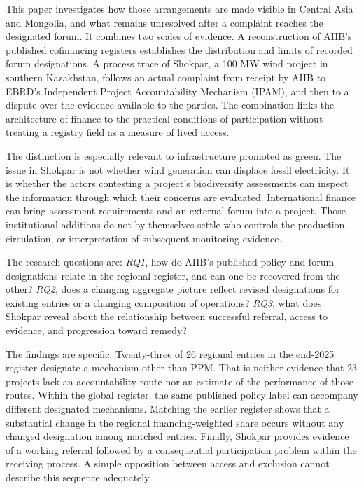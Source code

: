 \documentclass[11pt,a4paper]{article}
\begin{document}
This paper investigates how those arrangements are made visible in Central Asia and Mongolia, and what remains unresolved after a complaint reaches the designated forum. It combines two scales of evidence. A reconstruction of AIIB's published cofinancing registers establishes the distribution and limits of recorded forum designations. A process trace of Shokpar, a 100 MW wind project in southern Kazakhstan, follows an actual complaint from receipt by AIIB to EBRD's Independent Project Accountability Mechanism (IPAM), and then to a dispute over the evidence available to the parties. The combination links the architecture of finance to the practical conditions of participation without treating a registry field as a measure of lived access.

The distinction is especially relevant to infrastructure promoted as green. The issue in Shokpar is not whether wind generation can displace fossil electricity. It is whether the actors contesting a project's biodiversity assessments can inspect the information through which their concerns are evaluated. International finance can bring assessment requirements and an external forum into a project. Those institutional additions do not by themselves settle who controls the production, circulation, or interpretation of subsequent monitoring evidence.

The research questions are: \emph{RQ1}, how do AIIB's published policy and forum designations relate in the regional register, and can one be recovered from the other? \emph{RQ2}, does a changing aggregate picture reflect revised designations for existing entries or a changing composition of operations? \emph{RQ3}, what does Shokpar reveal about the relationship between successful referral, access to evidence, and progression toward remedy?

The findings are specific. Twenty-three of 26 regional entries in the end-2025 register designate a mechanism other than PPM. That is neither evidence that 23 projects lack an accountability route nor an estimate of the performance of those routes. Within the global register, the same published policy label can accompany different designated mechanisms. Matching the earlier register shows that a substantial change in the regional financing-weighted share occurs without any changed designation among matched entries. Finally, Shokpar provides evidence of a working referral followed by a consequential participation problem within the receiving process. A simple opposition between access and exclusion cannot describe this sequence adequately.
\end{document}
